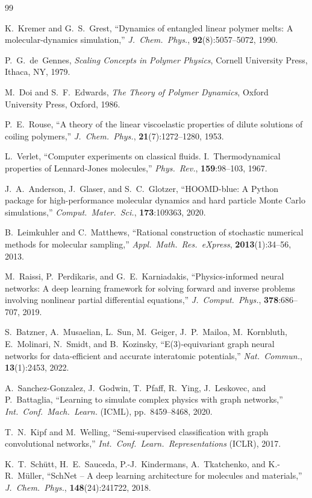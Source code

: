 \documentclass[12pt,a4paper]{article}
\begin{document}
\begin{thebibliography}{99}

K.~Kremer and G.~S.~Grest,
``Dynamics of entangled linear polymer melts: A molecular-dynamics simulation,''
\textit{J.~Chem.~Phys.}, \textbf{92}(8):5057--5072, 1990.

P.~G.~de~Gennes,
\textit{Scaling Concepts in Polymer Physics},
Cornell University Press, Ithaca, NY, 1979.

M.~Doi and S.~F.~Edwards,
\textit{The Theory of Polymer Dynamics},
Oxford University Press, Oxford, 1986.

P.~E.~Rouse,
``A theory of the linear viscoelastic properties of dilute solutions of coiling polymers,''
\textit{J.~Chem.~Phys.}, \textbf{21}(7):1272--1280, 1953.

L.~Verlet,
``Computer experiments on classical fluids. I.~Thermodynamical properties of Lennard-Jones molecules,''
\textit{Phys.~Rev.}, \textbf{159}:98--103, 1967.

J.~A.~Anderson, J.~Glaser, and S.~C.~Glotzer,
``HOOMD-blue: A Python package for high-performance molecular dynamics and hard particle Monte Carlo simulations,''
\textit{Comput.~Mater.~Sci.}, \textbf{173}:109363, 2020.

B.~Leimkuhler and C.~Matthews,
``Rational construction of stochastic numerical methods for molecular sampling,''
\textit{Appl.~Math.~Res.~eXpress}, \textbf{2013}(1):34--56, 2013.

M.~Raissi, P.~Perdikaris, and G.~E.~Karniadakis,
``Physics-informed neural networks: A deep learning framework for solving forward and inverse problems involving nonlinear partial differential equations,''
\textit{J.~Comput.~Phys.}, \textbf{378}:686--707, 2019.

S.~Batzner, A.~Musaelian, L.~Sun, M.~Geiger, J.~P.~Mailoa, M.~Kornbluth, E.~Molinari, N.~Smidt, and B.~Kozinsky,
``E(3)-equivariant graph neural networks for data-efficient and accurate interatomic potentials,''
\textit{Nat.~Commun.}, \textbf{13}(1):2453, 2022.

A.~Sanchez-Gonzalez, J.~Godwin, T.~Pfaff, R.~Ying, J.~Leskovec, and P.~Battaglia,
``Learning to simulate complex physics with graph networks,''
\textit{Int.~Conf.~Mach.~Learn.} (ICML), pp.~8459--8468, 2020.

T.~N.~Kipf and M.~Welling,
``Semi-supervised classification with graph convolutional networks,''
\textit{Int.~Conf.~Learn.~Representations} (ICLR), 2017.

K.~T.~Sch{\"u}tt, H.~E.~Sauceda, P.-J.~Kindermans, A.~Tkatchenko, and K.-R.~M{\"u}ller,
``SchNet -- A deep learning architecture for molecules and materials,''
\textit{J.~Chem.~Phys.}, \textbf{148}(24):241722, 2018.

\end{thebibliography}
\end{document}
